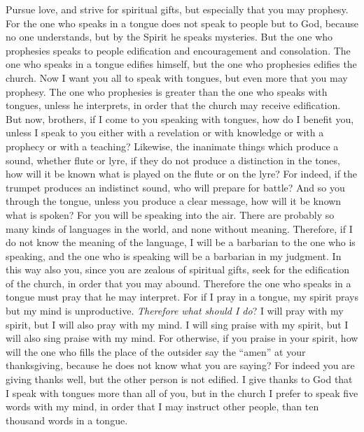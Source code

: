 \begin{biblechapter} %
 Pursue love, and strive for spiritual gifts, but especially that you may prophesy.
\verse For the one who speaks in a tongue does not speak to people but to God, because no one understands, but by the Spirit he speaks mysteries.
\verse But the one who prophesies speaks to people edification and encouragement and consolation.
\verse The one who speaks in a tongue edifies himself, but the one who prophesies edifies the church.
\verse Now I want you all to speak with tongues, but even more that you may prophesy. The one who prophesies is greater than the one who speaks with tongues, unless he interprets, in order that the church may receive edification.
\verse But now, brothers, if I come to you speaking with tongues, how do I benefit you, unless I speak to you either with a revelation or with knowledge or with a prophecy or with a teaching?
\verse Likewise, the inanimate things which produce a sound, whether flute or lyre, if they do not produce a distinction in the tones, how will it be known what is played on the flute or on the lyre?
\verse For indeed, if the trumpet produces an indistinct sound, who will prepare for battle?
\verse And so you through the tongue, unless you produce a clear message, how will it be known what is spoken? For you will be speaking into the air.
\verse There are probably so many kinds of languages in the world, and none without meaning.
\verse Therefore, if I do not know the meaning of the language, I will be a barbarian to the one who is speaking, and the one who is speaking will be a barbarian in my judgment.
\verse In this way also you, since you are zealous of spiritual gifts, seek for the edification of the church, in order that you may abound.
\verse Therefore the one who speaks in a tongue must pray that he may interpret.
\verse For if I pray in a tongue, my spirit prays but my mind is unproductive.
\verse \textit{Therefore what should I do}? I will pray with my spirit, but I will also pray with my mind. I will sing praise with my spirit, but I will also sing praise with my mind.
\verse For otherwise, if you praise in your spirit, how will the one who fills the place of the outsider say the “amen” at your thanksgiving, because he does not know what you are saying?
\verse For indeed you are giving thanks well, but the other person is not edified.
\verse I give thanks to God that I speak with tongues more than all of you,
\verse but in the church I prefer to speak five words with my mind, in order that I may instruct other people, than ten thousand words in a tongue.

\end{biblechapter}
